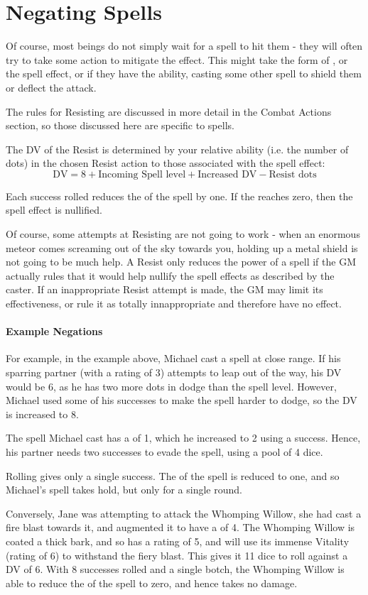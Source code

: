 \chapter{Negating Spells}

Of course, most beings do not simply wait for a spell to hit them - they will often try to take some action to mitigate the effect. This might take the form of ,  or  the spell effect, or if they have the ability, casting some other spell to shield them or deflect the attack. 

The rules for Resisting are discussed in more detail in the Combat Actions section, so those discussed here are specific to spells. 

The DV of the Resist is determined by your relative ability (i.e. the number of dots) in the chosen Resist action to those associated with the spell effect:
$$ \text{DV}  = 8 + \text{Incoming Spell level} + \text{Increased DV} - \text{Resist dots} $$

Each success rolled reduces the  of the spell by one. If the  reaches zero, then the spell effect is nullified. 


Of course, some attempts at Resisting are not going to work - when an enormous meteor comes screaming out of the sky towards you, holding up a metal shield is not going to be much help. A Resist only reduces the power of a spell if the GM actually rules that it would help nullify the spell effects as described by the caster. If an inappropriate Resist attempt is made, the GM may limit its effectiveness, or rule it as totally innappropriate and therefore have no effect. 

\subsubsection{Example Negations}

For example, in the example above, Michael cast a \levelOne{} spell at close range. If his sparring partner (with a  rating of 3) attempts to leap out of the way, his DV would be 6, as he has two more dots in dodge than the spell level. However, Michael used some of his successes to make the spell harder to dodge, so the DV is increased to 8. 

The spell Michael cast has a  of 1, which he increased to 2 using a success. Hence, his partner needs two successes to evade the spell, using a  pool of 4 dice. 

Rolling  gives only a single success. The  of the spell is reduced to one, and so Michael's spell takes hold, but only for a single round. 

Conversely, Jane was attempting to attack the Whomping Willow, she had cast a \levelThree{} fire blast towards it, and augmented it to have a  of 4. The Whomping Willow is coated a thick bark, and so has a  rating of 5, and will use its immense Vitality (rating of 6) to withstand the fiery blast. This gives it 11 dice to roll against a DV of 6. With 8 successes rolled and a single botch, the Whomping Willow is able to reduce the  of the spell to zero, and hence takes no damage. 


